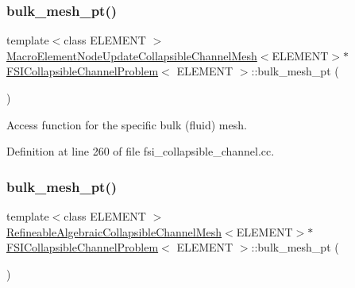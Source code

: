 \subsubsection{\texorpdfstring{bulk\+\_\+mesh\+\_\+pt()}{bulk\_mesh\_pt()}\hspace{0.1cm}{\footnotesize\ttfamily [2/6]}}
{\footnotesize\ttfamily template$<$class E\+L\+E\+M\+E\+NT $>$ \\
\hyperlink{classoomph_1_1MacroElementNodeUpdateCollapsibleChannelMesh}{Macro\+Element\+Node\+Update\+Collapsible\+Channel\+Mesh}$<$E\+L\+E\+M\+E\+NT$>$$\ast$ \hyperlink{classFSICollapsibleChannelProblem}{F\+S\+I\+Collapsible\+Channel\+Problem}$<$ E\+L\+E\+M\+E\+NT $>$\+::bulk\+\_\+mesh\+\_\+pt (\begin{DoxyParamCaption}{ }\end{DoxyParamCaption})\hspace{0.3cm}{\ttfamily [inline]}}



Access function for the specific bulk (fluid) mesh. 



Definition at line 260 of file fsi\+\_\+collapsible\+\_\+channel.\+cc.

\mbox{\label{classFSICollapsibleChannelProblem_afa3825057e5875deda297c68eb893f74}} 
\subsubsection{\texorpdfstring{bulk\+\_\+mesh\+\_\+pt()}{bulk\_mesh\_pt()}\hspace{0.1cm}{\footnotesize\ttfamily [3/6]}}
{\footnotesize\ttfamily template$<$class E\+L\+E\+M\+E\+NT $>$ \\
\hyperlink{classoomph_1_1RefineableAlgebraicCollapsibleChannelMesh}{Refineable\+Algebraic\+Collapsible\+Channel\+Mesh}$<$E\+L\+E\+M\+E\+NT$>$$\ast$ \hyperlink{classFSICollapsibleChannelProblem}{F\+S\+I\+Collapsible\+Channel\+Problem}$<$ E\+L\+E\+M\+E\+NT $>$\+::bulk\+\_\+mesh\+\_\+pt (\begin{DoxyParamCaption}{ }\end{DoxyParamCaption})\hspace{0.3cm}{\ttfamily [inline]}}



